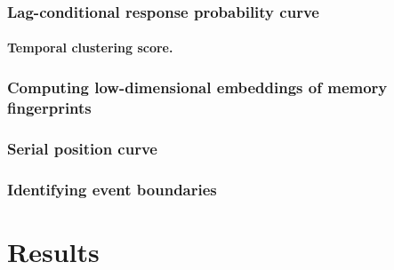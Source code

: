 \documentclass[11pt]{article}
\begin{document}
\subsubsection*{Lag-conditional response probability curve}


\paragraph*{Temporal clustering score.}

\subsubsection*{Computing low-dimensional embeddings of memory fingerprints}

\subsubsection{Serial position curve}

\subsubsection*{Identifying event boundaries}

\section*{Results}
\end{document}
